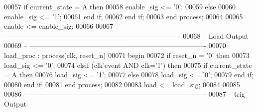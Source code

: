 \begin{DoxyCode}
00057       \textcolor{keywordflow}{if} \textcolor{vhdlchar}{current_state} \textcolor{vhdlchar}{=} \textcolor{vhdlchar}{A} \textcolor{keywordflow}{then}
00058          enable\_sig <= '0';
00059       \textcolor{keywordflow}{else} 
00060          enable\_sig <= '1';
00061       \textcolor{keywordflow}{end} \textcolor{keywordflow}{if};
00062    \textcolor{keywordflow}{end} \textcolor{keywordflow}{if};
00063 \textcolor{keywordflow}{end} \textcolor{keywordflow}{process};
00064 
00065 enable <= enable\_sig;
00066 
00067 \textcolor{keyword}{-- ----------------------------------------------------------------------------}
00068 \textcolor{keyword}{-- Load Output}
00069 \textcolor{keyword}{-- ----------------------------------------------------------------------------}
00070 load\_proc : \textcolor{keywordflow}{process}(clk, reset_n)
00071 \textcolor{vhdlkeyword}{begin}
00072    \textcolor{keywordflow}{if} \textcolor{vhdlchar}{reset_n} \textcolor{vhdlchar}{=} \textcolor{vhdlchar}{'}\textcolor{vhdllogic}{}\textcolor{vhdllogic}{0}\textcolor{vhdlchar}{'} \textcolor{keywordflow}{then} 
00073       \textcolor{vhdlchar}{load_sig} \textcolor{vhdlchar}{<=} \textcolor{vhdlchar}{'}\textcolor{vhdllogic}{}\textcolor{vhdllogic}{0}\textcolor{vhdlchar}{'};
00074    \textcolor{keywordflow}{elsif} \textcolor{vhdlchar}{(}\textcolor{vhdlchar}{clk}\textcolor{vhdlchar}{'}\textcolor{vhdlkeyword}{event} \textcolor{keywordflow}{AND} \textcolor{vhdlchar}{clk}\textcolor{vhdlchar}{=}\textcolor{vhdlchar}{'}\textcolor{vhdllogic}{}\textcolor{vhdllogic}{1}\textcolor{vhdlchar}{'}\textcolor{vhdlchar}{)} \textcolor{keywordflow}{then} 
00075       \textcolor{keywordflow}{if} \textcolor{vhdlchar}{current_state} \textcolor{vhdlchar}{=} \textcolor{vhdlchar}{A} \textcolor{keywordflow}{then}
00076          \textcolor{vhdlchar}{load_sig} \textcolor{vhdlchar}{<=} \textcolor{vhdlchar}{'}\textcolor{vhdllogic}{}\textcolor{vhdllogic}{1}\textcolor{vhdlchar}{'};
00077       \textcolor{keywordflow}{else} 
00078          \textcolor{vhdlchar}{load_sig} \textcolor{vhdlchar}{<=} \textcolor{vhdlchar}{'}\textcolor{vhdllogic}{}\textcolor{vhdllogic}{0}\textcolor{vhdlchar}{'};
00079       \textcolor{keywordflow}{end} \textcolor{keywordflow}{if};
00080    \textcolor{keywordflow}{end} \textcolor{keywordflow}{if};
00081 \textcolor{keywordflow}{end} \textcolor{keywordflow}{process};
00082 
00083 \textcolor{vhdlchar}{load} \textcolor{vhdlchar}{<=} \textcolor{vhdlchar}{load_sig};
00084 
00085 
00086 \textcolor{keyword}{-- ----------------------------------------------------------------------------}
00087 \textcolor{keyword}{-- trig Output}

\end{DoxyCode}
